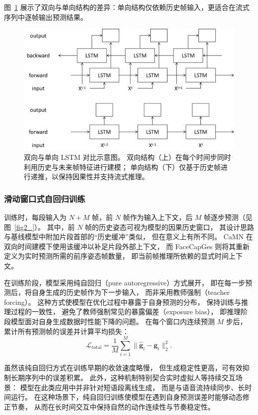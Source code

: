 图~\ref{fig_lstmcompare} 展示了双向与单向结构的差异：单向结构仅依赖历史帧输入，更适合在流式序列中逐帧输出预测结果。

\begin{figure}[h!t]
\centering
\includegraphics[width=0.9\linewidth]{figures/Fig_lstmcompare.png}
\caption{双向与单向 LSTM 对比示意图。
双向结构（上）在每个时间步同时利用历史与未来帧特征进行建模；
单向结构（下）仅基于历史帧进行递推，以保持因果性并支持流式推理。}
\label{fig_lstmcompare}
\end{figure}

\subsubsection{滑动窗口式自回归训练}

训练时，每段输入为 $N+M$ 帧，前 $N$ 帧作为输入上下文，后 $M$ 帧逐步预测（见图~\ref{fig2_}）。
其中，前 $N$ 帧的历史姿态可视为模型的因果历史窗口，
其设计思路与基线模型中附加片段首部的“历史缓冲”类似，
但在意义上有所不同。
CaMN 在双向时间建模下使用该缓冲以补足片段外部上下文，
而 FaceCapGes 则将其重新定义为实时预测所需的前序姿态帧数量，
即当前帧推理所依赖的显式时间上下文。

在训练阶段，模型采用纯自回归（pure autoregressive）方式展开，
即在每一步预测后，将自身生成的历史帧作为下一步输入，
而非采用教师强制（teacher forcing）。
这种方式使模型在优化过程中暴露于自身预测的分布，
保持训练与推理过程的一致性，
避免了教师强制常见的暴露偏差（exposure bias），
即推理阶段模型面对自身生成数据时性能下降的问题。
在每个窗口内连续预测 $M$ 步后，
累计所有预测帧的误差并计算平均损失：
\begin{equation}
\mathcal{L}_{\text{total}} = \frac{1}{M}\sum_{i=1}^{M} \|\hat{\bm{g}}_i - \bm{g}_i\|_2^2.
\end{equation}

虽然该纯自回归方式在训练早期的收敛速度略慢，
但生成稳定性更高，可有效抑制长期序列中的误差积累。
此外，这种机制特别契合实时虚拟人等持续交互场景：
模型在此类应用中并非针对短语段离线生成，
而是与语音流持续同步、长时间运行。
在这种场景下，纯自回归训练使模型在遇到自身预测误差时能够动态修正节奏，
从而在长时间交互中保持自然的动作连续性与节奏稳定性。

